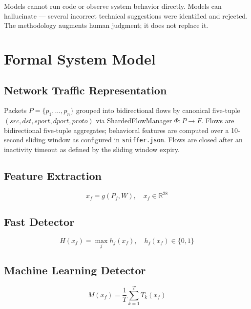 \documentclass[11pt,a4paper]{article}
\begin{document}
Models cannot run code or observe system behavior directly. Models can hallucinate --- several
incorrect technical suggestions were identified and rejected. The methodology augments human
judgment; it does not replace it.

\section{Formal System Model}

\subsection{Network Traffic Representation}

Packets $P = \{p_1, \dots, p_n\}$ grouped into bidirectional flows by canonical five-tuple
$(src, dst, sport, dport, proto)$ via ShardedFlowManager $\Phi : P \rightarrow F$. Flows
are bidirectional five-tuple aggregates; behavioral features are computed over a 10-second
sliding window as configured in \texttt{sniffer.json}. Flows are closed after an inactivity
timeout as defined by the sliding window expiry.

\subsection{Feature Extraction}

\begin{equation}
  x_f = g(P_f, W), \quad x_f \in \mathbb{R}^{28}
\end{equation}

\subsection{Fast Detector}

\begin{equation}
  H(x_f) = \max_j h_j(x_f), \quad h_j(x_f) \in \{0, 1\}
\end{equation}

\subsection{Machine Learning Detector}

\begin{equation}
  M(x_f) = \frac{1}{T} \sum_{k=1}^{T} T_k(x_f)
\end{equation}
\end{document}
